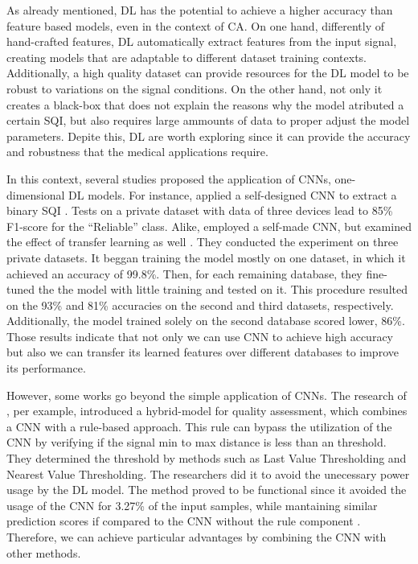 As already mentioned, \acrfull{DL} has the potential to achieve a higher accuracy than feature based models, even in the context of \acrshort{CA}. On one hand, differently of hand-crafted features, \acrshort{DL} automatically extract features from the input signal, creating models that are adaptable to different dataset training contexts. Additionally, a high quality dataset can provide resources for the \acrshort{DL} model to be robust to variations on the signal conditions. On the other hand, not only it creates a black-box that does not explain the reasons why the model atributed a certain \acrshort{SQI}, but also requires large ammounts of data to proper adjust the model parameters. Depite this, \acrshort{DL} are worth exploring since it can provide the accuracy and robustness that the medical applications require. 

In this context, several studies proposed the application of \acrshort{CNN}s, one-dimensional \acrshort{DL} models. For instance, \citeauthor{review-8} applied a self-designed \acrshort{CNN} to extract a binary \acrshort{SQI} \cite{review-8}. Tests on a private dataset with data of three devices lead to 85\% F1-score for the ``Reliable'' class. Alike, \citeauthor{review-9} employed a self-made \acrshort{CNN}, but examined the effect of transfer learning as well \cite{review-9}. They conducted the experiment on three private datasets. It beggan training the model mostly on one dataset, in which it achieved an accuracy of 99.8\%. Then, for each remaining database, they fine-tuned the the model with little training and tested on it. This procedure resulted on the 93\% and 81\% accuracies on the second and third datasets, respectively. Additionally, the model trained solely on the second database scored lower, 86\%. Those results indicate that not only we can use \acrshort{CNN} to achieve high accuracy but also we can transfer its learned features over different databases to improve its performance.

However, some works go beyond the simple application of \acrshort{CNN}s. The research of \citeauthor{review-10}, per example, introduced a hybrid-model for quality assessment, which combines a \acrshort{CNN} with a rule-based approach. This rule can bypass the utilization of the \acrshort{CNN} by verifying if the signal min to max distance is less than an threshold. They determined the threshold by methods such as Last Value Thresholding and Nearest Value Thresholding. The researchers did it to avoid the unecessary power usage by the \acrshort{DL} model. The method proved to be functional since it avoided the usage of the \acrshort{CNN} for 3.27\% of the input samples, while mantaining similar prediction scores if compared to the \acrshort{CNN} without the rule component \cite{review-10}. Therefore, we can achieve particular advantages by combining the \acrshort{CNN} with other methods.  

